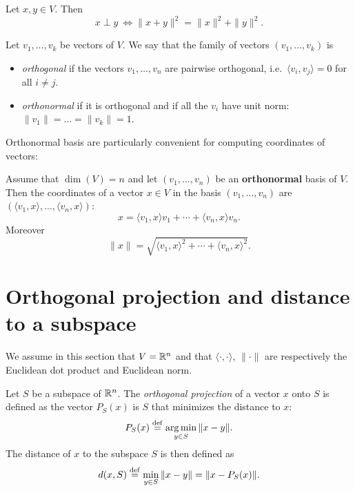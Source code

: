 \documentclass[11pt,nocut]{article}
\begin{document}

\begin{theorem}
	Let $x,y \in V$. Then
	$$
	x \perp y \ \Longleftrightarrow \|x+y\|^2 = \|x\|^2 + \|y\|^2.
	$$
\end{theorem}


\begin{definition}
	Let $v_1, \dots, v_k$ be vectors of $V$. We say that the family of vectors $(v_1, \dots, v_k)$ is
	\begin{itemize}
		\item \emph{orthogonal} if the vectors $v_1, \dots, v_n$ are pairwise orthogonal, i.e.\ $\langle v_i, v_j \rangle = 0$ for all $i \neq j$.
		\item \emph{orthonormal} if it is orthogonal and if all the $v_i$ have unit norm: $\|v_1\| = \dots = \|v_k\| = 1$.
	\end{itemize}
\end{definition}

Orthonormal basis are particularly convenient for computing coordinates of vectors:

\begin{proposition}\label{prop:coords}
	Assume that $\dim(V)=n$ and let $(v_1, \dots, v_n)$ be an \textbf{orthonormal} basis of $V$. Then the coordinates of a vector $x \in V$ in the basis $(v_1, \dots, v_n)$ are $(\langle v_1, x\rangle, \dots, \langle v_n,x \rangle)$:
	$$
	x = \langle v_1, x \rangle v_1 + \cdots + \langle v_n, x \rangle v_n.
	$$
	Moreover
	$$
	\|x\| = \sqrt{\langle v_1, x \rangle^2 + \cdots + \langle v_n, x \rangle^2}.
	$$
\end{proposition}

\section{Orthogonal projection and distance to a subspace}

We assume in this section that $V = \mathbb{R}^n$ and that $\langle \cdot, \cdot \rangle$, $\| \cdot \|$ are respectively the Euclidean dot product and Euclidean norm.

\begin{definition}
	Let $S$ be a subspace of $\mathbb{R}^n$. The \emph{orthogonal projection} of a vector $x$ onto $S$ is defined as the vector $P_S(x)$ is $S$ that minimizes the distance to $x$:
	$$
	P_S(x) \overset{\rm def}{=} \operatorname*{arg\,min}_{y \in S} \|x - y\|.
	$$
	The distance of $x$ to the subspace $S$ is then defined as
	$$
	d(x,S) \overset{\rm def}{=} \min_{y \in S} \| x - y \| = \|x - P_S(x)\|.
	$$
\end{definition}
\end{document}
